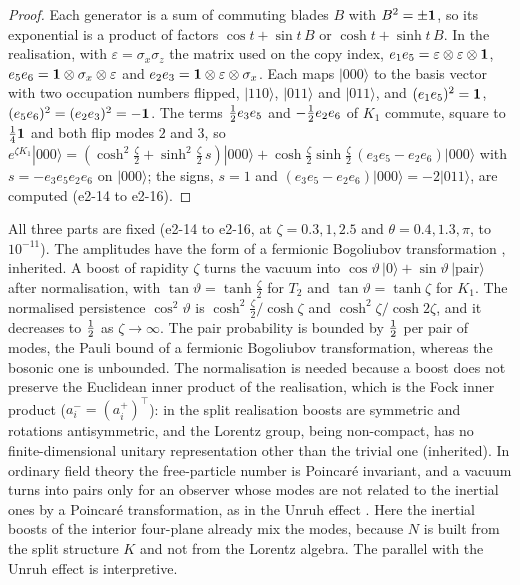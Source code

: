 \begin{proof}
Each generator is a sum of commuting blades $B$ with $B^2=\pm\mathbf 1$, so its exponential is a product of factors $\cos t+\sin t\,B$ or
$\cosh t+\sinh t\,B$. In the realisation, with $\varepsilon=\sigma_x\sigma_z$ the matrix used on the copy index,
$e_1e_5=\varepsilon\otimes\varepsilon\otimes\mathbf 1$, $e_5e_6=\mathbf 1\otimes\sigma_x\otimes\varepsilon$ and $e_2e_3=\mathbf 1\otimes\varepsilon\otimes\sigma_x$. Each maps
$|000\rangle$ to the basis vector with two occupation numbers flipped, $|110\rangle$, $|011\rangle$ and $|011\rangle$, and $(e_1e_5)^2=\mathbf 1$,
$(e_5e_6)^2=(e_2e_3)^2=-\mathbf 1$. The terms $\tfrac12 e_3e_5$ and $-\tfrac12 e_2e_6$ of $K_1$ commute, square to $\tfrac14\mathbf 1$ and both flip modes $2$ and $3$, so
$e^{\zeta K_1}|000\rangle=(\cosh^2\tfrac\zeta2+\sinh^2\tfrac\zeta2\,s)|000\rangle+\cosh\tfrac\zeta2\sinh\tfrac\zeta2\,(e_3e_5-e_2e_6)|000\rangle$ with $s=-e_3e_5e_2e_6$ on
$|000\rangle$; the signs, $s=1$ and $(e_3e_5-e_2e_6)|000\rangle=-2|011\rangle$, are computed (e2-14 to e2-16).
\end{proof}

All three parts are fixed (e2-14 to e2-16, at $\zeta=0.3,1,2.5$ and $\theta=0.4,1.3,\pi$, to $10^{-11}$). The amplitudes have the form of a
fermionic Bogoliubov transformation \cite{Bogoliubov58,Berezin66}, inherited. A boost of rapidity $\zeta$ turns the vacuum into
$\cos\vartheta\,|0\rangle+\sin\vartheta\,|\text{pair}\rangle$ after normalisation, with $\tan\vartheta=\tanh\tfrac\zeta2$ for $T_2$ and $\tan\vartheta=\tanh\zeta$ for
$K_1$. The normalised persistence $\cos^2\vartheta$ is $\cosh^2\tfrac\zeta2/\cosh\zeta$ and $\cosh^2\zeta/\cosh2\zeta$, and it decreases to $\tfrac12$ as
$\zeta\to\infty$. The pair probability is bounded by $\tfrac12$ per pair of modes, the Pauli bound of a fermionic Bogoliubov
transformation, whereas the bosonic one is unbounded. The normalisation is needed because a boost does not preserve the Euclidean inner
product of the realisation, which is the Fock inner product ($a^-_i=(a^+_i)^{\!\top}$): in the split realisation boosts are symmetric and rotations
antisymmetric, and the Lorentz group, being non-compact, has no finite-dimensional unitary representation other than the trivial one
\cite{WeinbergQFT} (inherited). In ordinary field theory the free-particle number is Poincar\'e invariant, and a vacuum turns into
pairs only for an observer whose modes are not related to the inertial ones by a Poincar\'e transformation, as in the Unruh effect
\cite{Unruh76}. Here the inertial boosts of the interior four-plane already mix the modes, because $N$ is built from the split structure
$K$ and not from the Lorentz algebra. The parallel with the Unruh effect is interpretive.

